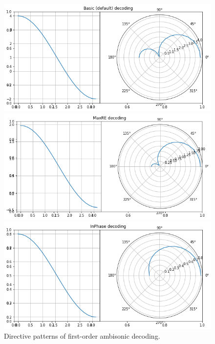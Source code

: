 \begin{figure}[htbp]
	\begin{center}
	\begin{minipage}[b]{0.9\linewidth}
		\centerline{\includegraphics[width=\textwidth]{Figures/Introduction/basic.png}}
	\end{minipage}
	\begin{minipage}[b]{0.9\linewidth}
		\centerline{\includegraphics[width=\textwidth]{Figures/Introduction/maxre.png}}
	\end{minipage}
		\begin{minipage}[c]{0.9\linewidth}
		\centerline{\includegraphics[width=\textwidth]{Figures/Introduction/inphase.png}}
	\end{minipage}
	\caption{Directive patterns of first-order ambisonic decoding.}
	\label{fig:alpha}
	\end{center}
\end{figure}


